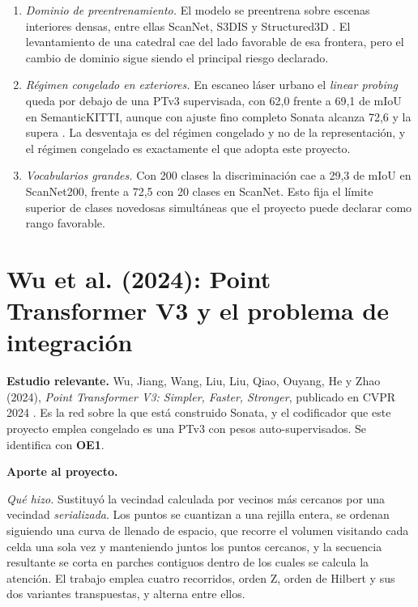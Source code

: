 \begin{enumerate}
\item \textit{Dominio de preentrenamiento.} El modelo se preentrena sobre escenas
interiores densas, entre ellas ScanNet, S3DIS y Structured3D
\cite{wu2025sonata}. El levantamiento de una catedral cae del lado favorable de
esa frontera, pero el cambio de dominio sigue siendo el principal riesgo
declarado.

\item \textit{Régimen congelado en exteriores.} En escaneo láser urbano el
\emph{linear probing} queda por debajo de una PTv3 supervisada, con 62,0 frente a
69,1 de mIoU en SemanticKITTI, aunque con ajuste fino completo Sonata alcanza
72,6 y la supera \cite[Tabla~8]{wu2025sonata}. La desventaja es del
régimen congelado y no de la representación, y el régimen congelado es
exactamente el que adopta este proyecto.

\item \textit{Vocabularios grandes.} Con 200 clases la discriminación cae a 29,3
de mIoU en ScanNet200, frente a 72,5 con 20 clases en ScanNet. Esto fija el
límite superior de clases novedosas simultáneas que el proyecto puede declarar
como rango favorable.
\end{enumerate}

\section[Point Transformer V3]{Wu et al. (2024): Point Transformer V3 y el
problema de integración}
\label{sec:ptv3}

\textbf{Estudio relevante.} Wu, Jiang, Wang, Liu, Liu, Qiao, Ouyang, He y Zhao
(2024), \emph{Point Transformer V3: Simpler, Faster, Stronger}, publicado en
CVPR 2024 \cite{wu2024ptv3}. Es la red sobre la que está construido Sonata, y el
codificador que este proyecto emplea congelado es una PTv3 con pesos
auto-supervisados. Se identifica con \textbf{OE1}.

\textbf{Aporte al proyecto.}

\emph{Qué hizo.} Sustituyó la vecindad calculada por vecinos más cercanos por una
vecindad \emph{serializada}. Los puntos se cuantizan a una rejilla entera, se
ordenan siguiendo una curva de llenado de espacio, que recorre el volumen
visitando cada celda una sola vez y manteniendo juntos los puntos cercanos, y la
secuencia resultante se corta en parches contiguos dentro de los cuales se
calcula la atención. El trabajo emplea cuatro recorridos, orden Z, orden de
Hilbert y sus dos variantes transpuestas, y alterna entre ellos.


